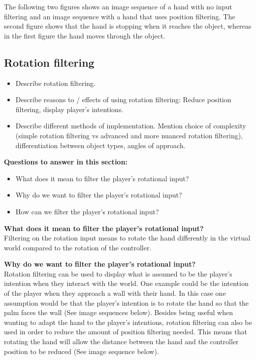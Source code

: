 The following two figures shows an image sequence of a hand with no input filtering and an image sequence with a hand that uses position filtering. The second figure shows that the hand is stopping when it reaches the object, whereas in the first figure the hand moves through the object.


\subsection{Rotation filtering}
\label{subsec:categoryRotationFiltering}
\begin{itemize}
\item Describe rotation filtering.
\item Describe reasons to / effects of using rotation filtering: Reduce position filtering, display player's intentions.
\item Describe different methods of implementation. Mention choice of complexity (simple rotation filtering vs advanced and more nuanced rotation filtering), differentiation between object types, angles of approach.
\end{itemize}

\textbf{Questions to answer in this section:}
\begin{itemize}
\item What does it mean to filter the player's rotational input?
\item Why do we want to filter the player's rotational input?
\item How can we filter the player's rotational input?
\end{itemize}

\textbf{What does it mean to filter the player's rotational input?}\\
Filtering on the rotation input means to rotate the hand differently in the virtual world compared to the rotation of the controller.

\textbf{Why do we want to filter the player's rotational input?}\\
Rotation filtering can be used to display what is assumed to be the player's intention when they interact with the world. One example could be the intention of the player when they approach a wall with their hand. In this case one assumption would be that the player's intention is to rotate the hand so that the palm faces the wall (See image sequences below). Besides being useful when wanting to adapt the hand to the player's intentions, rotation filtering can also be used in order to reduce the amount of position filtering needed. This means that rotating the hand will allow the distance between the hand and the controller position to be reduced (See image sequence below).

